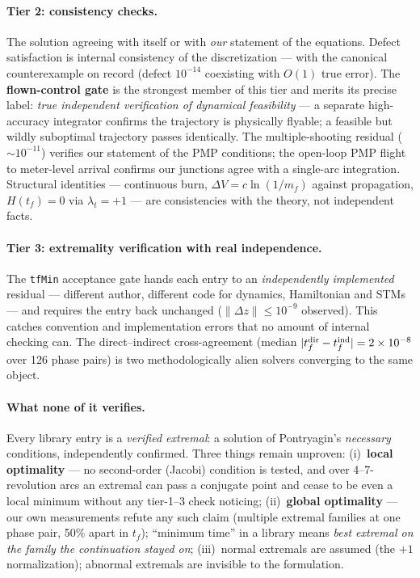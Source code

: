 \documentclass[11pt]{article}
\begin{document}
\paragraph{Tier 2: consistency checks.} The solution agreeing with itself
or with \emph{our} statement of the equations. Defect satisfaction is
internal consistency of the discretization --- with the canonical
counterexample on record (defect $10^{-14}$ coexisting with $O(1)$ true
error). The \textbf{flown-control gate} is the strongest member of this
tier and merits its precise label: \emph{true independent verification of
dynamical feasibility} --- a separate high-accuracy integrator confirms
the trajectory is physically flyable; a feasible but wildly suboptimal
trajectory passes identically. The multiple-shooting residual
($\sim10^{-11}$) verifies our statement of the PMP conditions; the
open-loop PMP flight to meter-level arrival confirms our junctions agree
with a single-arc integration. Structural identities --- continuous burn,
$\Delta V = c\ln(1/m_f)$ against propagation, $H(t_f)=0$ via
$\lambda_t = +1$ --- are consistencies with the theory, not independent
facts.

\paragraph{Tier 3: extremality verification with real independence.} The
\texttt{tfMin} acceptance gate hands each entry to an \emph{independently
implemented} residual --- different author, different code for dynamics,
Hamiltonian and STMs --- and requires the entry back unchanged
($\lVert\Delta z\rVert\leq10^{-9}$ observed). This catches convention and
implementation errors that no amount of internal checking can. The
direct--indirect cross-agreement (median
$|t_f^{\rm dir}-t_f^{\rm ind}| = 2\times10^{-8}$ over 126 phase pairs) is
two methodologically alien solvers converging to the same object.

\paragraph{What none of it verifies.} Every library entry is a
\emph{verified extremal}: a solution of Pontryagin's \emph{necessary}
conditions, independently confirmed. Three things remain unproven:
(i)~\textbf{local optimality} --- no second-order (Jacobi) condition is
tested, and over 4--7-revolution arcs an extremal can pass a conjugate
point and cease to be even a local minimum without any tier-1--3 check
noticing; (ii)~\textbf{global optimality} --- our own measurements refute
any such claim (multiple extremal families at one phase pair, 50\% apart
in $t_f$); ``minimum time'' in a library means \emph{best extremal on the
family the continuation stayed on}; (iii)~normal extremals are assumed
(the $+1$ normalization); abnormal extremals are invisible to the
formulation.
\end{document}
